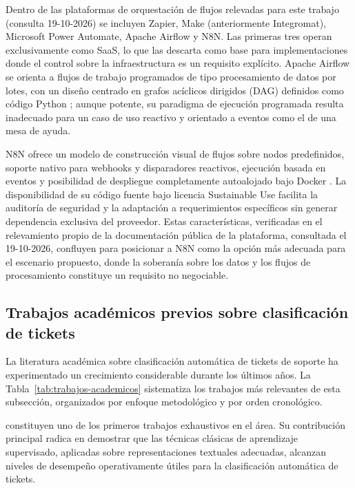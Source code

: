 Dentro de las plataformas de orquestación de flujos relevadas para este trabajo (consulta 19-10-2026) se incluyen Zapier, Make (anteriormente Integromat), Microsoft Power Automate, Apache Airflow y N8N. Las primeras tres operan exclusivamente como SaaS, lo que las descarta como base para implementaciones donde el control sobre la infraestructura es un requisito explícito. Apache Airflow se orienta a flujos de trabajo programados de tipo procesamiento de datos por lotes, con un diseño centrado en grafos acíclicos dirigidos (DAG) definidos como código Python \parencite{Apache2024_airflow}; aunque potente, su paradigma de ejecución programada resulta inadecuado para un caso de uso reactivo y orientado a eventos como el de una mesa de ayuda.

N8N ofrece un modelo de construcción visual de flujos sobre nodos predefinidos, soporte nativo para webhooks y disparadores reactivos, ejecución basada en eventos y posibilidad de despliegue completamente autoalojado bajo Docker \parencite{n8n2024_docs}. La disponibilidad de su código fuente bajo licencia Sustainable Use facilita la auditoría de seguridad y la adaptación a requerimientos específicos sin generar dependencia exclusiva del proveedor. Estas características, verificadas en el relevamiento propio de la documentación pública de la plataforma, consultada el 19-10-2026, confluyen para posicionar a N8N como la opción más adecuada para el escenario propuesto, donde la soberanía sobre los datos y los flujos de procesamiento constituye un requisito no negociable.

\subsection{Trabajos académicos previos sobre clasificación de tickets}\label{subsec:trabajos-academicos}

La literatura académica sobre clasificación automática de tickets de soporte ha experimentado un crecimiento considerable durante los últimos años. La Tabla~\ref{tab:trabajos-academicos} sistematiza los trabajos más relevantes de esta subsección, organizados por enfoque metodológico y por orden cronológico.

\textcite{Paramesh2019_it_service_desk} constituyen uno de los primeros trabajos exhaustivos en el área. Su contribución principal radica en demostrar que las técnicas clásicas de aprendizaje supervisado, aplicadas sobre representaciones textuales adecuadas, alcanzan niveles de desempeño operativamente útiles para la clasificación automática de tickets.

